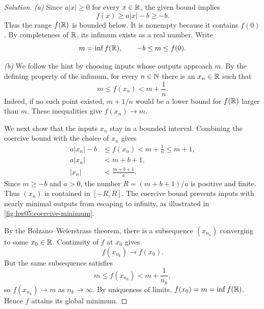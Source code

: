 \begin{proof}[Solution]
  \textit{(a)} Since $a|x|\ge0$ for every $x\in\mathbb{R}$, the given bound
  implies
  \[
    f(x)\ge a|x|-b\ge-b.
  \]
  Thus the range $f(\mathbb{R})$ is bounded below. It is nonempty because it
  contains $f(0)$. By completeness of $\mathbb{R}$, its infimum exists as a
  real number. Write
  \[
    m=\inf f(\mathbb{R}),\qquad -b\le m\le f(0).
  \]

  \textit{(b)} We follow the hint by choosing inputs whose outputs
  approach $m$. By the defining property of the infimum, for every
  $n\in\mathbb{N}$ there is an $x_n\in\mathbb{R}$ such that
  \[
    m\le f(x_n)<m+\frac1n.
  \]
  Indeed, if no such point existed, $m+1/n$ would be a lower bound
  for $f(\mathbb{R})$ larger than $m$. These inequalities give $f(x_n)\to m$.

  We next show that the inputs $x_n$ stay in a bounded interval.
  Combining the coercive bound with the choice of $x_n$ gives
  \begin{align*}
    a|x_n|-b&\le f(x_n)<m+\frac1n\le m+1,\\
    a|x_n|&<m+b+1,\\
    |x_n|&<\frac{m+b+1}{a}.
  \end{align*}
  Since $m\ge-b$ and $a>0$, the number
  $R=(m+b+1)/a$ is positive and finite. Thus $(x_n)$ is contained
  in $[-R,R]$. The coercive bound prevents inputs with nearly
  minimal outputs from escaping to infinity, as illustrated in
  \autoref{fig:hw05:coercive-minimum}.

  \begin{marginfigure}
    \centering
    
    \caption[A coercive bound traps a minimising sequence.]{%
      An example with $f(x)=1+x^2$ and the lower bound
      $|x|-1$. Here $m=1$. If $f(x)<m+1=2$, the lower bound forces
      $|x|<3$. The indicated points approach the minimum inside
      this bounded interval.}
    \label{fig:hw05:coercive-minimum}
  \end{marginfigure}

  By the Bolzano--Weierstrass theorem, there is a subsequence
  $(x_{n_k})$ converging to some $x_0\in\mathbb{R}$. Continuity of $f$ at
  $x_0$ gives
  \[
    f(x_{n_k})\longrightarrow f(x_0).
  \]
  But the same subsequence satisfies
  \[
    m\le f(x_{n_k})<m+\frac1{n_k},
  \]
  so $f(x_{n_k})\to m$ as $n_k\to\infty$. By uniqueness of limits,
  $f(x_0)=m=\inf f(\mathbb{R})$. Hence $f$ attains its global minimum.
\end{proof}
